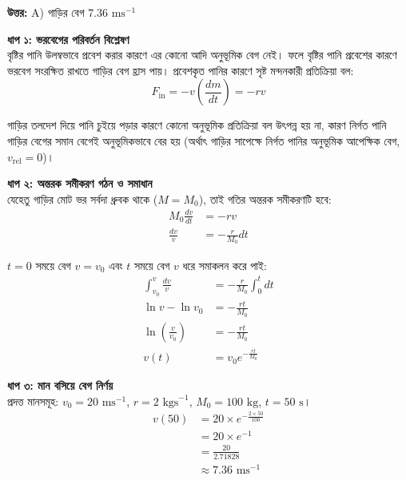 \documentclass[12pt, a4paper]{article}
\begin{document}
\vspace{0.5em}
\begin{tcolorbox}[answerbox]
    \textbf{\color{success} উত্তর:} A) গাড়ির বেগ $7.36\text{ ms}^{-1}$
\end{tcolorbox}
\vspace{1em}

\begin{tcolorbox}[solutionbox={সমাধান (Solution)}]
    \noindent
    \textbf{ধাপ ১: ভরবেগের পরিবর্তন বিশ্লেষণ} \\
    বৃষ্টির পানি উলম্বভাবে প্রবেশ করার কারণে এর কোনো আদি অনুভূমিক বেগ নেই। ফলে বৃষ্টির পানি প্রবেশের কারণে ভরবেগ সংরক্ষিত রাখতে গাড়ির বেগ হ্রাস পায়। প্রবেশকৃত পানির কারণে সৃষ্ট মন্দনকারী প্রতিক্রিয়া বল:
    \[ F_{\text{in}} = -v \left(\frac{dm}{dt}\right) = -r v \]
    
    গাড়ির তলদেশ দিয়ে পানি চুইয়ে পড়ার কারণে কোনো অনুভূমিক প্রতিক্রিয়া বল উৎপন্ন হয় না, কারণ নির্গত পানি গাড়ির বেগের সমান বেগেই অনুভূমিকভাবে বের হয় (অর্থাৎ গাড়ির সাপেক্ষে নির্গত পানির অনুভূমিক আপেক্ষিক বেগ, $v_{\text{rel}} = 0$)।
    
    \vspace{0.5em}
    \noindent\textbf{ধাপ ২: অন্তরক সমীকরণ গঠন ও সমাধান} \\
    যেহেতু গাড়ির মোট ভর সর্বদা ধ্রুবক থাকে ($M = M_0$), তাই গতির অন্তরক সমীকরণটি হবে:
    \begin{align*}
        M_0 \frac{dv}{dt} &= -r v \\
        \frac{dv}{v} &= -\frac{r}{M_0} dt
    \end{align*}
    
    $t = 0$ সময়ে বেগ $v = v_0$ এবং $t$ সময়ে বেগ $v$ ধরে সমাকলন করে পাই:
    \begin{align*}
        \int_{v_0}^{v} \frac{dv}{v} &= -\frac{r}{M_0} \int_{0}^{t} dt \\
        \ln v - \ln v_0 &= -\frac{r t}{M_0} \\
        \ln\left(\frac{v}{v_0}\right) &= -\frac{r t}{M_0} \\
        v(t) &= v_0 e^{-\frac{r t}{M_0}}
    \end{align*}
    
    \vspace{0.5em}
    \noindent\textbf{ধাপ ৩: মান বসিয়ে বেগ নির্ণয়} \\
    প্রদত্ত মানসমূহ: $v_0 = 20\text{ ms}^{-1}$, $r = 2\text{ kgs}^{-1}$, $M_0 = 100\text{ kg}$, $t = 50\text{ s}$।
    \begin{align*}
        v(50) &= 20 \times e^{-\frac{2 \times 50}{100}} \\
              &= 20 \times e^{-1} \\
              &= \frac{20}{2.71828} \\
              &\approx \mathbf{7.36}\text{ ms}^{-1}
    \end{align*}
\end{tcolorbox}
\end{document}
